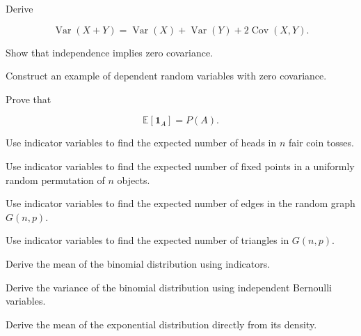 \begin{exercise}[3]
Derive

\[
\operatorname{Var}(X+Y)
=
\operatorname{Var}(X)
+
\operatorname{Var}(Y)
+
2\operatorname{Cov}(X,Y).
\]
\end{exercise}

\begin{exercise}[3]
Show that independence implies zero covariance.
\end{exercise}

\begin{exercise}[3]
Construct an example of dependent random variables with zero covariance.
\end{exercise}

\begin{exercise}[3]
Prove that

\[
\mathbb{E}[\mathbf{1}_A]
=
P(A).
\]
\end{exercise}

\begin{exercise}[3]
Use indicator variables to find the expected number of heads in \(n\)
fair coin tosses.
\end{exercise}

\begin{exercise}[3]
Use indicator variables to find the expected number of fixed points in a
uniformly random permutation of \(n\) objects.
\end{exercise}

\begin{exercise}[3]
Use indicator variables to find the expected number of edges in the
random graph \(G(n,p)\).
\end{exercise}

\begin{exercise}[3]
Use indicator variables to find the expected number of triangles in
\(G(n,p)\).
\end{exercise}

\begin{exercise}[3]
Derive the mean of the binomial distribution using indicators.
\end{exercise}

\begin{exercise}[3]
Derive the variance of the binomial distribution using independent
Bernoulli variables.
\end{exercise}

\begin{exercise}[3]
Derive the mean of the exponential distribution directly from its
density.
\end{exercise}

